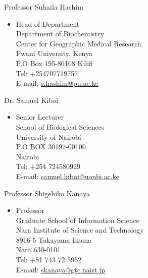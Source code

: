 \documentclass[10pt]{article}
\newenvironment{innerlist}[1][\enskip\textbullet]%
{\begin{itemize}[#1,leftmargin=*,parsep=0pt,itemsep=0pt,topsep=0pt,partopsep=0pt]}
	{\end{itemize}}
\newcommand{\halfblankline}{\quad\vspace{-0.5\baselineskip}\pagebreak[3]}
\begin{document}
\halfblankline%

 Professor Suhaila Hashim
 \begin{innerlist}
 	\item[]  Head of Department\\
 	Department of Biochemistry\\
 	Center for Geographic Medical Research\\
 	Pwani University, Kenya\\
 	P.O Box 195-80108 Kilifi\\
 	Tel: +254707719757\\
 	E-mail: \href{mailto:s.hashim@pu.ac.ke}{s.hashim@pu.ac.ke}
 \end{innerlist}
 
\halfblankline

Dr. Samuel Kiboi
\begin{innerlist}
	\item[]  Senior Lecturer\\
	School of Biological Sciences\\
	University of Nairobi\\
	P.O BOX 30197-00100\\
	Nairobi\\
	Tel: +254 724580929\\
	E-mail: \href{mailto:samuel.kiboi@uonbi.ac.ke}{samuel.kiboi@uonbi.ac.ke}
	
\end{innerlist}

 \halfblankline



Professor Shigehiko Kanaya
\begin{innerlist}
\item[]  Professor\\
Graduate School of Information Science\\
Nara Institute of Science and Technology\\
8916-5 Takayama Ikoma\\
Nara 630-0101\\
Tel: +81 743 72 5952\\
E-mail: \href{mailto:skanaya@gtc.naist.jp}{skanaya@gtc.naist.jp}

\end{innerlist}
\end{document}
